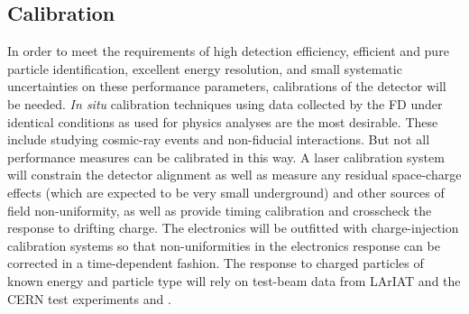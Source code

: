 
\subsection{Calibration}

In order to meet the requirements of high detection efficiency, efficient and
pure particle identification, excellent energy resolution, and small systematic
uncertainties on these performance parameters, calibrations of the detector
will be needed.  {\it In situ} calibration techniques using data collected by the FD
under identical conditions as used for physics analyses are the most desirable.
These include studying cosmic-ray events and non-fiducial interactions.  But not
all performance measures can be calibrated in this way.  A laser calibration system
will constrain the detector alignment as well as measure any residual space-charge effects
(which are expected to be very small underground) and other sources of field non-uniformity,
as well as provide timing calibration and crosscheck the response to drifting charge.  
The electronics will be outfitted with
charge-injection calibration systems so that non-uniformities in the electronics response
can be corrected in a time-dependent fashion.  The response to charged particles of known
energy and particle type will rely on test-beam data from LArIAT and the CERN test
experiments \cernsingleproto{} and \cerndualproto.
